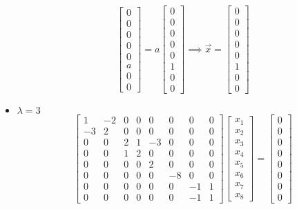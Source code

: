 \documentclass{report}
\begin{document}
\begin{itemize}
$$
\begin{bmatrix}
0 \\ 0 \\ 0 \\ 0 \\ 0 \\ a \\ 0 \\ 0
\end{bmatrix} =
a\begin{bmatrix}
0 \\ 0 \\ 0 \\ 0 \\ 0 \\ 1 \\ 0 \\ 0
\end{bmatrix} \implies
\vec{x} = \begin{bmatrix}
0 \\ 0 \\ 0 \\ 0 \\ 0 \\ 1 \\ 0 \\ 0
\end{bmatrix}
$$ 
\item $\lambda = 3$
$$
\begin{bmatrix}
1&-2&0&0&0&0&0&0\\
-3&2&0&0&0&0&0&0\\
0&0&2&1&-3&0&0&0\\
0&0&1&2&0&0&0&0\\
0&0&0&0&2&0&0&0\\
0&0&0&0&0&-8&0&0\\
0&0&0&0&0&0&-1&1\\
0&0&0&0&0&0&-1&1
\end{bmatrix}
\begin{bmatrix}
x_1 \\ x_2 \\ x_3 \\ x_4 \\ x_5 \\ x_6 \\ x_7 \\ x_8
\end{bmatrix} = \begin{bmatrix}
0 \\ 0 \\ 0 \\ 0 \\ 0 \\ 0 \\ 0 \\ 0

\end{bmatrix}$$
\end{itemize}
\end{document}
